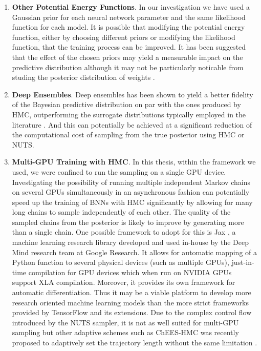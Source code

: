 \begin{enumerate}
    \item \textbf{Other Potential Energy Functions}. In our investigation we have used a Gaussian prior for each neural network parameter and the same likelihood function for each model. It is possible that modifying the potential energy function, either by choosing different priors or modifying the likelihood function, that the training process can be improved. It has been suggested that the effect of the chosen priors may yield a measurable impact on the predictive distribution although it may not be particularly noticable from studing the posterior distribution of weights \cite{google_bnn_posteriors}.
    \item \textbf{Deep Ensembles}. Deep ensembles has been shown to yield a better fidelity of the Bayesian predictive distribution on par with the ones produced by HMC, outperforming the surrogate distributions typically employed in the literature \cite{google_bnn_posteriors}. And this can potentially be achieved at a significant reduction of the computational cost of sampling from the true posterior using HMC or NUTS. 
    \item \textbf{Multi-GPU Training with HMC}. In this thesis, within the framework we used, we were confined to run the sampling on a single GPU device. Investigating the possibility of running multiple independent Markov chains on several GPUs simultaneously in an asynchronous fashion can potentially speed up the training of BNNs with HMC significantly by allowing for many long chains to sample independently of each other. The quality of the sampled chains from the posterior is likely to improve by generating more than a single chain. One possible framework to adopt for this is Jax \cite{jax}, a machine learning research library developed and used in-house by the Deep Mind research team at Google Research. It allows for automatic mapping of a Python function to several physical devices (such as multiple GPUs), just-in-time compilation for GPU devices which when run on NVIDIA GPUs support XLA compilation. Moreover, it provides its own framework for automatic differentiation. Thus it may be a viable platform to develop more research oriented machine learning models than the more strict frameworks provided by TensorFlow and its extensions. Due to the complex control flow introduced by the NUTS sampler, it is not as well suited for multi-GPU sampling but other adaptive schemes such as ChEES-HMC was recently proposed to adaptively set the trajectory length without the same limitation \cite{chees-hmc}.

\end{enumerate}
